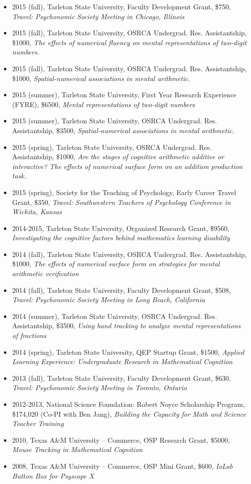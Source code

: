 \documentclass[article,10pt]{article}
\begin{document}
\begin{itemize}
\item 2015 (fall), Tarleton State University, Faculty Development Grant, \$750, \emph{Travel: Psychonomic Society Meeting in Chicago, Illinois}
\item 2015 (fall), Tarleton State University, OSRCA Undergrad. Res. Assistantship, \$1000, \emph{The effects of numerical fluency on mental representations of two-digit numbers.}
\item 2015 (fall), Tarleton State University, OSRCA Undergrad. Res. Assistantship, \$1000, \emph{Spatial-numerical associations in mental arithmetic.}
\item 2015 (summer), Tarleton State University, First Year Research Experience (FYRE), \$6500, \emph{Mental representations of two-digit numbers}
\item 2015 (summer), Tarleton State University, OSRCA Undergrad. Res. Assistantship, \$3500, \emph{Spatial-numerical associations in mental arithmetic.}
\item 2015 (spring), Tarleton State University, OSRCA Undergrad. Res. Assistantship, \$1000, \emph{Are the stages of cognitive arithmetic additive or interactive? The effects of numerical surface form on an addition production task.}
\item 2015 (spring), Society for the Teaching of Psychology, Early Career Travel Grant, \$350, \emph{Travel: Southwestern Teachers of Psychology Conference in Wichita, Kansas}
\item 2014-2015, Tarleton State University, Organized Research Grant, \$9560, \emph{Investigating the cognitive factors behind mathematics learning disability}
\item 2014 (fall), Tarleton State University, OSRCA Undergrad. Res. Assistantship, \$1000, \emph{The effects of numerical surface form on strategies for mental arithmetic verification}
\item 2014 (fall), Tarleton State University, Faculty Development Grant, \$508, \emph{Travel: Psychonomic Society Meeting in Long Beach, California}
\item 2014 (summer), Tarleton State University, OSRCA Undergrad. Res. Assistantship, \$3500, \emph{Using hand tracking to analyze mental representations of fractions}
\item 2014 (spring), Tarleton State University, QEP Startup Grant, \$1500, \emph{Applied Learning Experience: Undergraduate Research in Mathematical Cognition}
\item 2013 (fall), Tarleton State University, Faculty Development Grant, \$630, \emph{Travel: Psychonomic Society Meeting in Toronto, Ontario}
\item 2012-2013, National Science Foundation: Robert Noyce Scholarship Program, \$174,020 (Co-PI with Ben Jang), \emph{Building the Capacity for Math and Science Teacher Training}
\item 2010, Texas A\&M University – Commerce, OSP Research Grant, \$5000, \emph{Mouse Tracking in Mathematical Cognition}
\item 2008, Texas A\&M University – Commerce, OSP Mini Grant, \$600, \emph{IoLab Button Box for Psyscope X}
\end{itemize}
\end{document}
